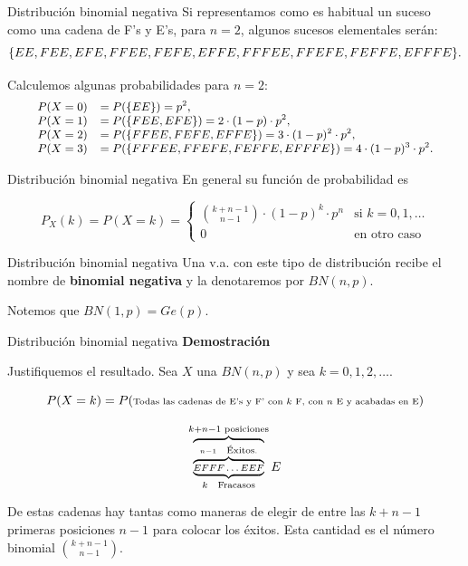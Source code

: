 \documentclass[
  ignorenonframetext,
  aspectratio=169]{beamer}
\begin{document}
\begin{frame}{Distribución binomial negativa}
\protect\hypertarget{distribuciuxf3n-binomial-negativa-2}{}
Si representamos como es habitual un suceso como una cadena de F's y
E's, para \(n=2\), algunos sucesos elementales serán:
\[\small{\{EE,FEE,EFE, FFEE,FEFE,EFFE,FFFEE,FFEFE,FEFFE,EFFFE\}.}\]

Calculemos algunas probabilidades para \(n=2\): \[
\small{
\begin{array}{rl}
P(X=0) & =P(\{EE\})=p^2, \\
P(X=1) & =P(\{FEE,EFE\})=2\cdot (1-p)\cdot p^2, \\
P(X=2) & =P(\{FFEE,FEFE,EFFE\})=3\cdot (1-p)^2\cdot p^2, \\
P(X=3) & =P(\{FFFEE,FFEFE,FEFFE,EFFFE\})=4\cdot (1-p)^3\cdot p^2.
\end{array}
}
\]
\end{frame}

\begin{frame}{Distribución binomial negativa}
\protect\hypertarget{distribuciuxf3n-binomial-negativa-3}{}
En general su función de probabilidad es

\[
P_{X}(k)=P(X=k)=\left\{\begin{array}{ll}
     {k+n-1\choose n-1} \cdot (1-p)^{k}\cdot p^n & \mbox{si } k=0,1,\ldots\\
     0 & \mbox{en otro caso}\end{array}\right.
\]
\end{frame}

\begin{frame}{Distribución binomial negativa}
\protect\hypertarget{distribuciuxf3n-binomial-negativa-4}{}
Una v.a. con este tipo de distribución recibe el nombre de
\textbf{binomial negativa} y la denotaremos por \(BN(n,p)\).

Notemos que \(BN(1,p)=Ge(p)\).
\end{frame}

\begin{frame}{Distribución binomial negativa}
\protect\hypertarget{distribuciuxf3n-binomial-negativa-5}{}
\textbf{Demostración}

Justifiquemos el resultado. Sea \(X\) una \(BN(n,p)\) y sea
\(k=0,1,2,\ldots\).

\[\scriptsize{P(X=k)=P(\mbox{Todas las cadenas de E's y F' con $k$ F, con $n$ E y acabadas en E})}\]

\[
\scriptsize{\overbrace{\underbrace{\overbrace{EFFF\ldots EEF}^{n-1 \quad \mbox{Éxitos}.}}}_{k \quad\mbox{Fracasos}}^{k+n-1\mbox{ posiciones}}E}
\]

De estas cadenas hay tantas como maneras de elegir de entre las
\(k+n-1\) primeras posiciones \(n-1\) para colocar los éxitos. Esta
cantidad es el número binomial \({k+n-1\choose n-1}.\)
\end{frame}
\end{document}
